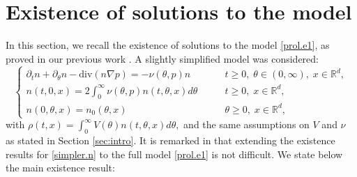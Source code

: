 \documentclass{amsart}
\def\R{\mathbb R}
\begin{document}
\section{Existence of solutions to the model}\label{sec:exist}
In this section, we recall the existence of solutions to the model \eqref{prol.e1}, as proved in our previous work \cite{llmw}. A slightly simplified model was considered:
\begin{equation}\label{simpler.n}
 \begin{cases}
        \partial_t n+\partial_\theta n-
    \text{div}(n \nabla p)=-\nu(\theta,p)n \qquad &t \geq 0,\; \theta \in (0, \infty),\; x \in \R^d, \\
        n(t,0,x)=2  \int_0^{\infty}\nu(\theta,p)n(t,\theta,x) d\theta \qquad &t \geq 0,\; x \in \R^d, \\
        n(0,\theta,x)=n_{0}(\theta,x)\qquad & \theta \geq 0, \;x \in \R^d ,
    \end{cases}
\end{equation}
with $\rho(t,x)=\int_{0}^{\infty}V(\theta)n(t,\theta,x)d\theta,$ and the same assumptions on $V$ and $\nu$ as stated in Section \ref{sec:intro}. It is remarked in \cite{llmw} that extending the existence results for \eqref{simpler.n} to the full model \eqref{prol.e1} is not difficult. We state below the main existence result:
\end{document}
